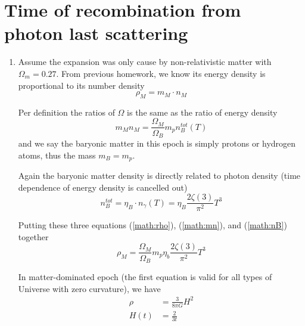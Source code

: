 \section{Time of recombination from photon last scattering}
\begin{enumerate}[label=\alph*)]
   \item Assume the expansion was only cause by non-relativistic matter with $\Omega_m = 0.27$.  From previous homework, we know its energy density is proportional to its number density
   \begin{equation}
      \rho_M = m_M \cdot n_M
      \label{math:rho}
   \end{equation}

   Per definition the ratios of $\Omega$ is the same as the ratio of energy density 
      \begin{equation}
         m_M n_M = \frac{\Omega_M}{\Omega_B} m_p n_B^{tot}(T)
         \label{math:mn}
      \end{equation}
      and we say the baryonic matter in this epoch is simply protons or hydrogen atoms, thus the mass $m_B = m_p$.

      Again the baryonic matter density is directly related to photon density (time dependence of energy density is cancelled out)
      \begin{equation}
         n_B^{tot} = \eta_B \cdot n_\gamma(T) = \eta_B \frac{2\zeta(3)}{\pi^2} T^3
         \label{math:nB}
      \end{equation}

      Putting these three equations (\ref{math:rho}), (\ref{math:mn}), and (\ref{math:nB}) together
      \begin{equation}
         \rho_M = \frac{\Omega_M}{\Omega_B} m_p \eta_b \frac{2\zeta(3)}{\pi^2} T^3
      \end{equation}

      In matter-dominated epoch (the first equation is valid for all types of Universe with zero curvature), we have
      \begin{align}
         \rho &= \frac{3}{8\pi G} H^2 \label{math:rho2}\\
         H(t) &= \frac{2}{3t} \label{math:Ht}
      \end{align}


\end{enumerate}

